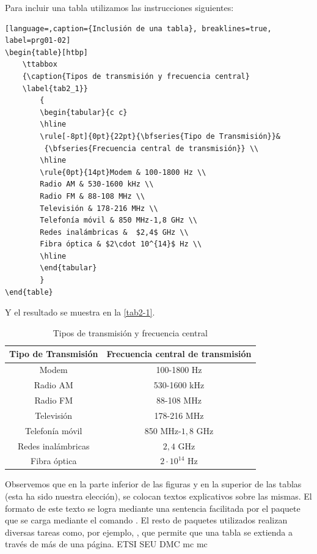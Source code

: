 Para incluir una tabla utilizamos las instrucciones siguientes:
\begin{lstlisting}[language=,caption={Inclusión de una tabla}, breaklines=true, label=prg01-02]
\begin{table}[htbp]
	\ttabbox
	{\caption{Tipos de transmisión y frecuencia central} 
	\label{tab2_1}}
		{
		\begin{tabular}{c c}
		\hline
		\rule[-8pt]{0pt}{22pt}{\bfseries{Tipo de Transmisión}}&
		 {\bfseries{Frecuencia central de transmisión}} \\
		\hline
		\rule{0pt}{14pt}Modem & 100-1800 Hz \\
		Radio AM & 530-1600 kHz \\
		Radio FM & 88-108 MHz \\
		Televisión & 178-216 MHz \\
		Telefonía móvil & 850 MHz-1,8 GHz \\
		Redes inalámbricas &  $2,4$ GHz \\
		Fibra óptica & $2\cdot 10^{14}$ Hz \\
		\hline
		\end{tabular}
		}
\end{table}
\end{lstlisting}

Y el resultado se muestra en la \autoref{tab2-1}.

\begin{table}[htbp]
	\ttabbox
	{\caption{Tipos de transmisión y frecuencia central} \label{tab2-1}}
		{
		\begin{tabular}{c c}
		\hline
		\rule[-8pt]{0pt}{22pt}{\bfseries{Tipo de Transmisión}}& {\bfseries{Frecuencia central de transmisión}} \\
		\hline
		\rule{0pt}{14pt}Modem & 100-1800 Hz \\
		Radio AM & 530-1600 kHz \\
		Radio FM & 88-108 MHz \\
		Televisión & 178-216 MHz \\
		Telefonía móvil & 850 MHz-$1,8$ GHz \\
		Redes inalámbricas &  $2,4$ GHz \\
		Fibra óptica & $2\cdot 10^{14}$ Hz \\
		\hline
		\end{tabular}
		}
\end{table}

Observemos  que en la parte inferior de las figuras y en la superior de las tablas (esta ha sido nuestra elección), se
colocan textos explicativos sobre las mismas. El formato de este texto se logra mediante una sentencia facilitada por el
paquete que se carga mediante el comando . El resto de paquetes utilizados realizan
diversas tareas como, por ejemplo, , que permite que una tabla se extienda a través de
más de una página. \gls{ETSI} \gls{SEU} \gls{DMC} \gls{mc} \acrlong{mc}

